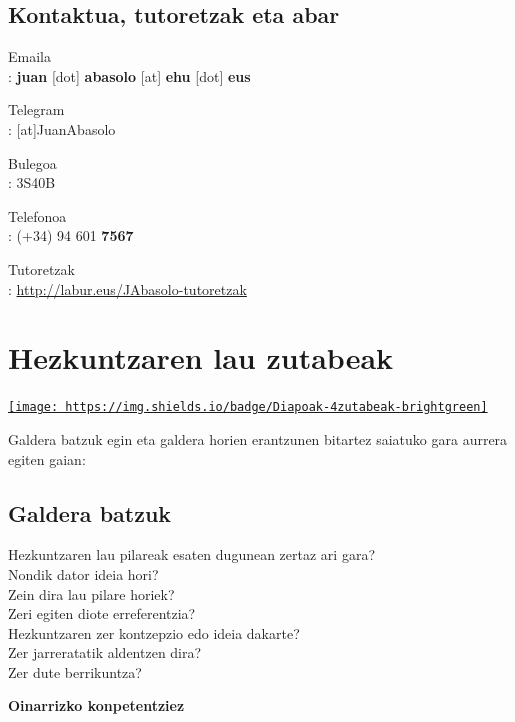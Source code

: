 \documentclass[
]{book}
\begin{document}
\hypertarget{kontaktua-tutoretzak-eta-abar}{%
\section*{Kontaktua, tutoretzak eta abar}\label{kontaktua-tutoretzak-eta-abar}}

Emaila\\
: \textbf{juan} {[}dot{]} \textbf{abasolo} {[}at{]} \textbf{ehu} {[}dot{]} \textbf{eus}

Telegram\\
: {[}at{]}JuanAbasolo

Bulegoa\\
: 3S40B

Telefonoa\\
: (+34) 94 601 \textbf{7567}

Tutoretzak\\
: \url{http://labur.eus/JAbasolo-tutoretzak}

\hypertarget{hezkuntzaren-lau-zutabeak}{%
\chapter{Hezkuntzaren lau zutabeak}\label{hezkuntzaren-lau-zutabeak}}

\href{../diapoak/01-Diapo.html}{\texttt{[image: https://img.shields.io/badge/Diapoak-4zutabeak-brightgreen]}}

Galdera batzuk egin eta galdera horien erantzunen bitartez saiatuko gara aurrera egiten gaian:

\hypertarget{galdera-batzuk}{%
\section{Galdera batzuk}\label{galdera-batzuk}}

Hezkuntzaren lau pilareak esaten dugunean zertaz ari gara?\\
Nondik dator ideia hori?\\
Zein dira lau pilare horiek?\\
Zeri egiten diote erreferentzia?\\
Hezkuntzaren zer kontzepzio edo ideia dakarte?\\
Zer jarreratatik aldentzen dira?\\
Zer dute berrikuntza?

\textbf{Oinarrizko konpetentziez}
\end{document}
